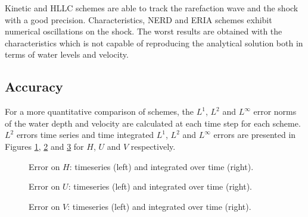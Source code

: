 Kinetic and HLLC schemes are able to track the rarefaction wave and the shock
with a good precision.
Characteristics, NERD and ERIA schemes exhibit numerical oscillations on the shock.
The worst results are obtained with the characteristics which is not capable of
reproducing the analytical solution both in terms of water levels and velocity.

\subsection{Accuracy}

For a more quantitative comparison of schemes, the $L^1$, $L^2$ and $L^\infty$
error norms of the water depth and velocity are calculated at each time step for
each scheme.
$L^2$ errors time series and time integrated $L^1$, $L^2$ and $L^\infty$ errors
are presented in Figures \ref{fig:stoker:ErrNumH}, \ref{fig:stoker:ErrNumU} and
\ref{fig:stoker:ErrNumV} for $H$, $U$ and $V$ respectively.

\begin{figure}[H]
\begin{minipage}[t]{0.45\textwidth}
 \centering
\end{minipage}
\begin{minipage}[t]{0.55\textwidth}
 \centering
\end{minipage}
  \caption{Error on $H$: timeseries (left) and integrated over time (right).}
  \label{fig:stoker:ErrNumH}
\end{figure}

\begin{figure}[H]
\begin{minipage}[t]{0.45\textwidth}
 \centering
\end{minipage}
\begin{minipage}[t]{0.55\textwidth}
 \centering
\end{minipage}
  \caption{Error on $U$: timeseries (left) and integrated over time (right).}
  \label{fig:stoker:ErrNumU}
\end{figure}

\begin{figure}[H]
\begin{minipage}[t]{0.45\textwidth}
 \centering
\end{minipage}
\begin{minipage}[t]{0.55\textwidth}
 \centering
\end{minipage}
  \caption{Error on $V$: timeseries (left) and integrated over time (right).}
  \label{fig:stoker:ErrNumV}
\end{figure}

